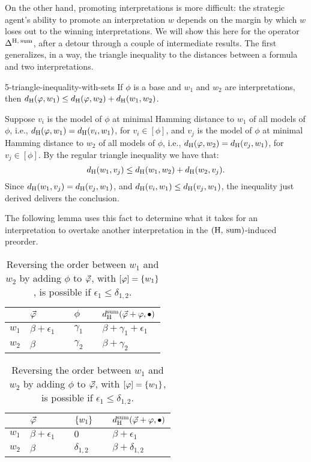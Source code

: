 On the other hand, promoting interpretations is more difficult: the strategic agent's ability to
promote an interpretation $w$ depends on the margin by which $w$ loses out to the winning interpretations.
We will show this here for the operator $\me^{\hamming,\:\ssum}$,
after a detour through a couple of intermediate results.
The first generalizes, in a way, the triangle inequality to the distances 
between a formula and two interpretations.

\begin{lem}{}{5-triangle-inequality-with-sets}
	If $\phi$ is a base and $w_1$ and $w_2$ are interpretations,
	then $\dd_\hamming(\phi,w_1)\le\dd_\hamming(\phi,w_2)+\dd_\hamming(w_1,w_2)$.
\end{lem}
\begin{prf*}{}{}%
	Suppose $v_i$ is the model of $\phi$ at minimal Hamming distance to $w_1$
	of all models of $\phi$, 
	i.e., $\dd_\hamming(\phi,w_1)=\dd_{\hamming}(v_i,w_1)$, for $v_i\in[\phi]$,
	and $v_j$ is the model of $\phi$ at minimal Hamming distance to $w_2$
	of all models of $\phi$, 
	i.e., $\dd_\hamming(\phi,w_2)=\dd_{\hamming}(v_j,w_1)$, for $v_j\in[\phi]$.
	By the regular triangle inequality we have that:
	$$
		\dd_{\hamming}(w_1,v_j)\le\dd_{\hamming}(w_1,w_2)+\dd_{\hamming}(w_2,v_j).
	$$
	Since $\dd_{\hamming}(w_1,v_j) = \dd_{\hamming}(v_j,w_1)$,
	and $\dd_{\hamming}(v_i,w_1)\le\dd_{\hamming}(v_j,w_1)$,
	the inequality just derived delivers the conclusion.
\end{prf*}

The following lemma uses this fact to determine what it takes for 
an interpretation to overtake another interpretation 
in the $(\hamming,\:\ssum)$-induced preorder.

\begin{table}\centering
	\begin{tabular}{clclcl}
		\toprule
		& $\P$ && $\phi$ &&$\dd_\hamming^\ssum(\P+\phi,\bullet)$\\\midrule
		$w_1$ & $\beta+\epsilon_1$ && $\gamma_1$ && $\beta+\gamma_1+\epsilon_1$\\
		$w_2$ & $\beta$ && $\gamma_2$ && $\beta+\gamma_2$\\ 
		\bottomrule
	\end{tabular}
	\caption{
		Reversing the order between $w_1$ and $w_2$ by adding $\phi$ to $\P$ is possible only if $\epsilon_1\le \delta_{1,2}$.
	}
	\label{tab:reversing-two-interpretations-1}				
	\begin{tabular}{clclcl}
		\toprule
		& $\P$ && $\set{w_1}$ &&$\dd_\hamming^\ssum(\P+\phi,\bullet)$\\\midrule
		$w_1$ & $\beta+\epsilon_1$ && $0$ && $\beta+\epsilon_1$\\
		$w_2$ & $\beta$ && $\delta_{1,2}$ && $\beta+\delta_{1,2}$\\ 
		\bottomrule
	\end{tabular}
	\caption{
		Reversing the order between $w_1$ and $w_2$ by adding 
		$\phi$ to $\P$, with $\mods{\phi}=\set{w_1}$, is possible if $\epsilon_1\le \delta_{1,2}$.
	}
	\label{tab:reversing-two-interpretations-2}				
\end{table}


